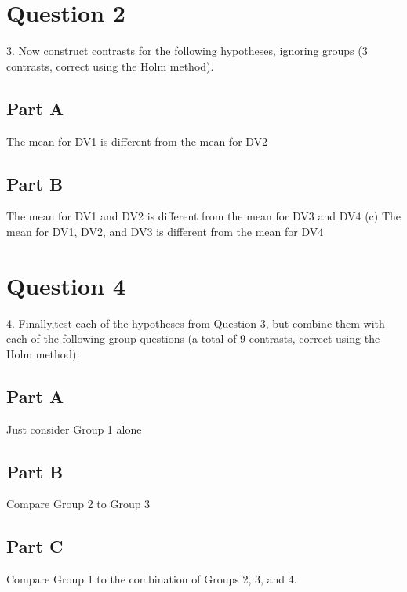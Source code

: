 \documentclass{article}\usepackage[]{graphicx}\usepackage[]{color}
\begin{document}
\section{Question 2}
3. Now construct contrasts for the following hypotheses, ignoring groups (3 contrasts, correct using the Holm method).

\subsection{Part A}
The mean for DV1 is different from the mean for DV2

\subsection{Part B}
The mean for DV1 and DV2 is different from the mean for DV3 and DV4 (c) The mean for DV1, DV2, and DV3 is different from the mean for DV4

\section{Question 4}
4. Finally,test each of the hypotheses from Question 3, but combine them with each of the following group questions (a total of 9 contrasts, correct using the Holm method): 

\subsection{Part A}
Just consider Group 1 alone

\subsection{Part B}
Compare Group 2 to Group 3

\subsection{Part C}
Compare Group 1 to the combination of Groups 2, 3, and 4.
\end{document}
